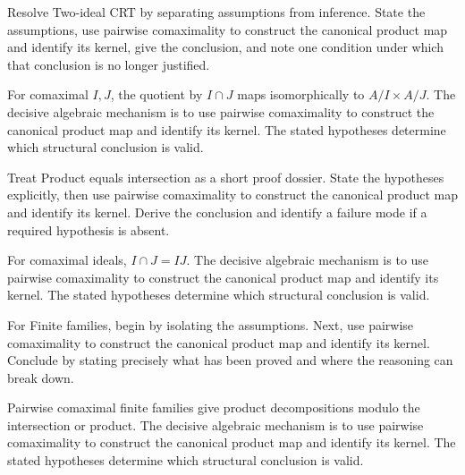 \begin{problem}\label{prob:v04-problem-02}
Resolve Two-ideal CRT by separating assumptions from inference. State the assumptions, use pairwise comaximality to construct the canonical product map and identify its kernel, give the conclusion, and note one condition under which that conclusion is no longer justified.
\end{problem}
\begin{solution}
For comaximal $I,J$, the quotient by $I\cap J$ maps isomorphically to $A/I\times A/J$. The decisive algebraic mechanism is to use pairwise comaximality to construct the canonical product map and identify its kernel. The stated hypotheses determine which structural conclusion is valid.
\end{solution}

\begin{problem}\label{prob:v04-problem-03}
Treat Product equals intersection as a short proof dossier. State the hypotheses explicitly, then use pairwise comaximality to construct the canonical product map and identify its kernel. Derive the conclusion and identify a failure mode if a required hypothesis is absent.
\end{problem}
\begin{solution}
For comaximal ideals, $I\cap J=IJ$. The decisive algebraic mechanism is to use pairwise comaximality to construct the canonical product map and identify its kernel. The stated hypotheses determine which structural conclusion is valid.
\end{solution}

\begin{problem}\label{prob:v04-problem-04}
For Finite families, begin by isolating the assumptions. Next, use pairwise comaximality to construct the canonical product map and identify its kernel. Conclude by stating precisely what has been proved and where the reasoning can break down.
\end{problem}
\begin{solution}
Pairwise comaximal finite families give product decompositions modulo the intersection or product. The decisive algebraic mechanism is to use pairwise comaximality to construct the canonical product map and identify its kernel. The stated hypotheses determine which structural conclusion is valid.
\end{solution}

